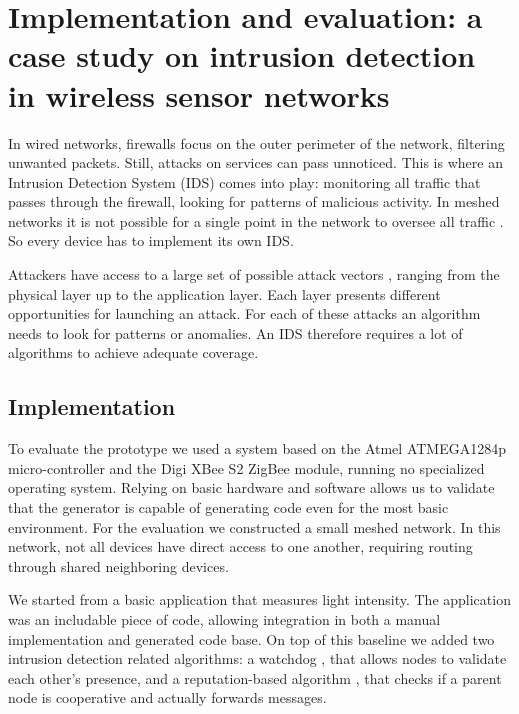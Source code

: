\documentclass[3p,times,procedia]{elsarticle}
\begin{document}
\section{
Implementation and evaluation:
a case study on intrusion detection in wireless sensor networks
}
\label{evaluation}

In wired networks, firewalls focus on the outer perimeter of the network,
filtering unwanted packets. Still, attacks on services can pass unnoticed. This
is where an Intrusion Detection System (IDS) comes into play: monitoring all
traffic that passes through the firewall, looking for patterns of malicious
activity\cite{denning1987intrusion}. In meshed networks it is not possible for
a single point in the network to oversee all traffic
\cite{mishra2004intrusion}. So every device has to implement its own IDS.\@

Attackers have access to a large set of possible attack vectors
\cite{aschenbruck2012security}, ranging from the physical layer up to the
application layer. Each layer presents different opportunities for launching an
attack. For each of these attacks an algorithm needs to look for patterns or
anomalies. An IDS therefore requires a lot of algorithms to achieve adequate
coverage.

\subsection{Implementation}

To evaluate the prototype we used a system based on the Atmel ATMEGA1284p
micro-controller and the Digi XBee S2 ZigBee module, running no specialized
operating system. Relying on basic hardware and software allows us to validate
that the generator is capable of generating code even for the most basic
environment. For the evaluation we constructed a small meshed network. In this
network, not all devices have direct access to one another, requiring routing
through shared neighboring devices.

We started from a basic application that measures light intensity. The
application was an includable piece of code, allowing integration in both a
manual implementation and generated code base. On top of this baseline we added
two intrusion detection related algorithms: a watchdog
\cite{mishra2004intrusion}, that allows nodes to validate each other's
presence, and a reputation-based algorithm \cite{ganeriwal2008reputation}, that
checks if a parent node is cooperative and actually forwards messages.
\end{document}
